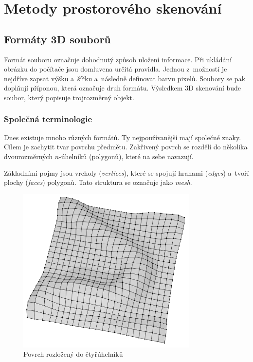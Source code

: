 \documentclass[12pt]{report}			%
\begin{document}
	\part{Metody prostorového skenování}

		\chapter{Formáty 3D souborů}

			 Formát souboru označuje dohodnutý způsob uložení informace. Při ukládání obrázku do počítače jsou domluvena určitá pravidla. Jednou z~možností je nejdříve zapsat výšku a~šířku a~následně definovat barvu pixelů. Soubory se pak doplňují příponou, která označuje druh formátu. Výsledkem 3D skenování bude soubor, který popisuje trojrozměrný objekt.

			\section{Společná terminologie}

                Dnes existuje mnoho různých formátů. Ty nejpoužívanější mají společné znaky. Cílem je zachytit tvar povrchu předmětu. Zakřivený povrch se rozdělí do několika dvourozměrných $n$-úhelníků (polygonů), které na sebe navazují.

                Základními pojmy jsou vrcholy (\emph{vertices}), které se spojují hranami (\emph{edges}) a~tvoří plochy (\emph{faces}) polygonů. Tato struktura se označuje jako \emph{mesh}.

                \begin{figure}[h]
                    \centering
                    \includegraphics[width=9cm]{images/mesh.pdf}
                    \caption{Povrch rozložený do čtyřúhelníků}
                \end{figure}
\end{document}
